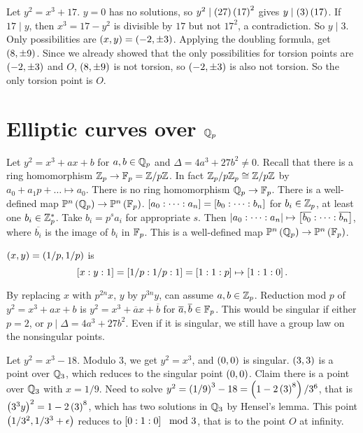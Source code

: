\begin{example*}
Let $ y^2 = x^3 + 17 $. $ y = 0 $ has no solutions, so $ y^2 \mid \rb{27}\rb{17}^2 $ gives $ y \mid \rb{3}\rb{17} $. If $ 17 \mid y $, then $ x^3 = 17 - y^2 $ is divisible by $ 17 $ but not $ 17^2 $, a contradiction. So $ y \mid 3 $. Only possibilities are $ \rb{x, y} = \rb{-2, \pm 3} $. Applying the doubling formula, get $ \rb{8, \pm 9} $. Since we already showed that the only possibilities for torsion points are $ \rb{-2, \pm 3} $ and $ O $, $ \rb{8, \pm 9} $ is not torsion, so $ \rb{-2, \pm 3} $ is also not torsion. So the only torsion point is $ O $.
\end{example*}

\pagebreak

\section{Elliptic curves over $ \Q_p $}


Let $ y^2 = x^3 + ax + b $ for $ a, b \in \Q_p $ and $ \Delta = 4a^3 + 27b^2 \ne 0 $. Recall that there is a ring homomorphism $ \Z_p \to \F_p = \Z / p\Z $. In fact $ \Z_p / p\Z_p \cong \Z / p\Z $ by $ a_0 + a_1p + \dots \mapsto a_0 $. There is no ring homomorphism $ \Q_p \to \F_p $. There is a well-defined map $ \P^n\rb{\Q_p} \to \P^n\rb{\F_p} $. $ \sb{a_0 : \dots : a_n} = \sb{b_0 : \dots : b_n} $ for $ b_i \in \Z_p $, at least one $ b_i \in \Z_p^* $. Take $ b_i = p^sa_i $ for appropriate $ s $. Then $ \abs{a_0 : \dots : a_n} \mapsto \sb{\overline{b_0} : \dots : \overline{b_n}} $, where $ \overline{b_i} $ is the image of $ b_i $ in $ \F_p $. This is a well-defined map $ \P^n\rb{\Q_p} \to \P^n\rb{\F_p} $.

\begin{example*}
$ \rb{x, y} = \rb{1 / p, 1 / p} $ is
$$ \sb{x : y : 1} = \sb{1 / p : 1 / p : 1} = \sb{1 : 1 : p} \mapsto \sb{1 : 1 : 0}. $$
\end{example*}

By replacing $ x $ with $ p^{2n}x $, $ y $ by $ p^{3n}y $, can assume $ a, b \in \Z_p $. Reduction mod $ p $ of $ y^2 = x^3 + ax + b $ is $ y^2 = x^3 + \overline{a}x + \overline{b} $ for $ \overline{a}, \overline{b} \in \F_p $. This would be singular if either $ p = 2 $, or $ p \mid \Delta = 4a^3 + 27b^2 $. Even if it is singular, we still have a group law on the nonsingular points.

\begin{example*}
Let $ y^2 = x^3 - 18 $. Modulo $ 3 $, we get $ y^2 = x^3 $, and $ \rb{0, 0} $ is singular. $ \rb{3, 3} $ is a point over $ \Q_3 $, which reduces to the singular point $ \rb{0, 0} $. Claim there is a point over $ \Q_3 $ with $ x = 1 / 9 $. Need to solve $ y^2 = \rb{1 / 9}^3 - 18 = \rb{1 - 2\rb{3}^8} / 3^6 $, that is $ \rb{3^3y}^2 = 1 - 2\rb{3}^8 $, which has two solutions in $ \Q_3 $ by Hensel's lemma. This point $ \rb{1 / 3^2, 1 / 3^3 + \epsilon} $ reduces to $ \sb{0 : 1 : 0} \mod 3 $, that is to the point $ O $ at infinity.
\end{example*}

